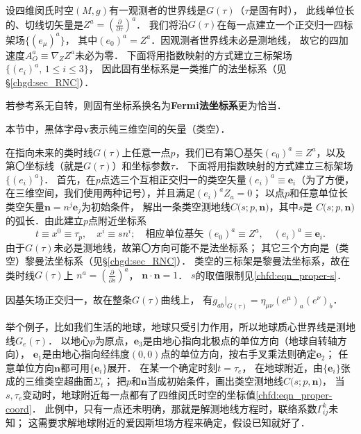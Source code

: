 设四维闵氏时空$(M,g)$有一观测者的世界线是$G(\tau)$（$\tau$是固有时），
此线单位长的、切线切矢量是$Z^a=(\frac{\partial }{\partial \tau})^a$．
我们将沿$G(\tau)$在每一点建立一个正交归一四标架场$\{(e_\mu)^a\}$，
其中$(e_0)^a=Z^a$．因观测者世界线未必是测地线，
故它的四加速度$A_O ^a \equiv \nabla_Z Z^a$未必为零．
下面将用指数映射的方式建立三标架场$\{(e_i)^a,\, 1\leqslant i \leqslant 3\}$，
因此固有坐标系是一类推广的法坐标系（见\S\ref{chgd:sec_RNC}）．

若参考系无自转，则固有坐标系换名为{\bfseries\heiti Fermi法坐标系}更为恰当．

本节中，黑体字母$\boldsymbol{v}$表示纯三维空间的矢量（类空）．


在指向未来的类时线$G(\tau)$上任意一点$p$，我们已有第〇基矢$(e_0)^a\equiv Z^a$，以及
第〇坐标线（就是$G(\tau)$）和坐标参数$\tau$．
下面将用指数映射的方式建立三标架场$\{(e_i)^a\}$．
首先，在$p$点选三个互相正交归一的类空矢量$(e_i)^a \equiv \boldsymbol{e}_i$（为了方便，
在三维空间，我们使用两种记号），并且满足$(e_i)^aZ_a=0$；
以点$p$和任意单位长类空矢量$\boldsymbol{n}= n^j \boldsymbol{e}_j$为初始条件，
解出一条类空测地线$C\bigl(s;p,\boldsymbol{n}\bigr)$，其中$s$是
$C\bigl(s;p,\boldsymbol{n}\bigr)$的弧长．由此建立$p$点附近坐标系
\begin{equation}\label{chfd:eqn_proper-coord}
    t \equiv x^0 \equiv \tau_p, \quad x^i \equiv s n^i;\quad
    \text{相应单位基矢}\ (e_0)^a\equiv Z^a,\quad (e_i)^a \equiv \boldsymbol{e}_i .
\end{equation}
由于$G(\tau)$未必是测地线，故第〇方向可能不是法坐标系；
其它三个方向是（类空）黎曼法坐标系（见\S\ref{chgd:sec_RNC}）．
类空的三标架是黎曼法坐标系，故在类时线$G(\tau)$上
$n^a = (\frac{\partial}{\partial s})^a$，
$\boldsymbol{n}\cdot \boldsymbol{n}=1$．
$s$的取值限制见\eqref{chfd:eqn_proper-s}．

因基矢场正交归一，故在整条$G(\tau)$曲线上，
有$g_{ab}|_{G(\tau)}= \eta_{\mu\nu}(e^\mu)_a (e^\nu)_b$．

\begin{example}\label{chfd:exm_proper-earth}
举个例子，比如我们生活的地球，地球只受引力作用，所以地球质心世界线是测地线$G_{e}(\tau)$．
以地心$p$为原点，$\boldsymbol{e}_3$是由地心指向北极点的单位方向（地球自转轴方向），
$\boldsymbol{e}_1$是由地心指向经纬度$(0,0)$点的单位方向，按右手叉乘法则确定$\boldsymbol{e}_2$；
任意单位方向$\boldsymbol{n}$都可用$\{\boldsymbol{e}_i\}$展开．
在某一个确定时刻$t=\tau_e$，
在地球附近，由$\{\boldsymbol{e}_i\}$张成的三维类空超曲面$\Sigma_t$；
把$p$和$\boldsymbol{n}$当成初始条件，画出类空测地线$C\bigl(s;p,\boldsymbol{n}\bigr)$，
当$s,\tau_e$变动时，地球附近每一点都有了四维闵氏时空的坐标值\eqref{chfd:eqn_proper-coord}．
此例中，只有一点还未明确，那就是解测地线方程时，联络系数$\Gamma^k_{ij}$未知；
这需要求解地球附近的爱因斯坦场方程来确定，假设已知就好了．
\end{example}


